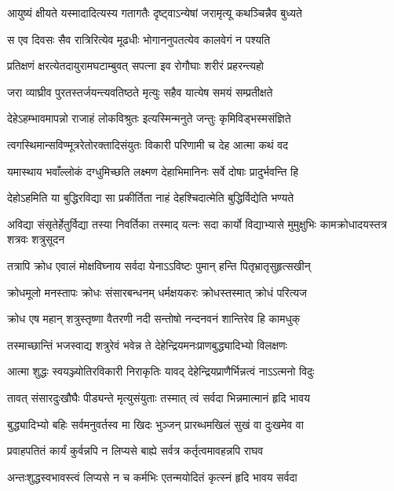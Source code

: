 \twolineshloka
{आयुष्यं क्षीयते यस्मादादित्यस्य गतागतैः}
{दृष्ट्वाऽन्येषां जरामृत्यू कथञ्चिन्नैव बुध्यते} %

\twolineshloka
{स एव दिवसः सैव रात्रिरित्येव मूढधीः}
{भोगाननुपतत्येव कालवेगं न पश्यति} %

\twolineshloka
{प्रतिक्षणं क्षरत्येतदायुरामघटाम्बुवत्}
{सपत्ना इव रोगौघाः शरीरं प्रहरन्त्यहो} %

\twolineshloka
{जरा व्याघ्रीव पुरतस्तर्जयन्त्यवतिष्ठते}
{मृत्युः सहैव यात्येष समयं सम्प्रतीक्षते} %

\twolineshloka
{देहेऽहम्भावमापन्नो राजाहं लोकविश्रुतः}
{इत्यस्मिन्मनुते जन्तुः कृमिविड्भस्मसंज्ञिते} %

\twolineshloka
{त्वगस्थिमान्सविण्मूत्ररेतोरक्तादिसंयुतः}
{विकारी परिणामी च देह आत्मा कथं वद} %

\twolineshloka
{यमास्थाय भवाँल्लोकं दग्धुमिच्छति लक्ष्मण}
{देहाभिमानिनः सर्वे दोषाः प्रादुर्भवन्ति हि} %

\twolineshloka
{देहोऽहमिति या बुद्धिरविद्या सा प्रकीर्तिता}
{नाहं देहश्चिदात्मेति बुद्धिर्विद्येति भण्यते} %

\threelineshloka
{अविद्या संसृतेर्हेतुर्विद्या तस्या निवर्तिका}
{तस्माद् यत्नः सदा कार्यो विद्याभ्यासे मुमुक्षुभिः}
{कामक्रोधादयस्तत्र शत्रवः शत्रुसूदन} %

\twolineshloka
{तत्रापि क्रोध एवालं मोक्षविघ्नाय सर्वदा}
{येनाऽऽविष्टः पुमान् हन्ति पितृभ्रातृसुहृत्सखीन्} %

\twolineshloka
{क्रोधमूलो मनस्तापः क्रोधः संसारबन्धनम्}
{धर्मक्षयकरः क्रोधस्तस्मात् क्रोधं परित्यज} %

\twolineshloka
{क्रोध एष महान् शत्रुस्तृष्णा वैतरणी नदी}
{सन्तोषो नन्दनवनं शान्तिरेव हि कामधुक्} %

\twolineshloka
{तस्माच्छान्तिं भजस्वाद्य शत्रुरेवं भवेन्न ते}
{देहेन्द्रियमनःप्राणबुद्ध्यादिभ्यो विलक्षणः} %

\twolineshloka
{आत्मा शुद्धः स्वयञ्ज्योतिरविकारी निराकृतिः}
{यावद् देहेन्द्रियप्राणैर्भिन्नत्वं नाऽऽत्मनो विदुः} %

\twolineshloka
{तावत् संसारदुःखौघैः पीड्यन्ते मृत्युसंयुताः}
{तस्मात् त्वं सर्वदा भिन्नमात्मानं हृदि भावय} %

\twolineshloka
{बुद्ध्यादिभ्यो बहिः सर्वमनुवर्तस्व मा खिदः}
{भुञ्जन् प्रारब्धमखिलं सुखं वा दुःखमेव वा} %

\twolineshloka
{प्रवाहपतितं कार्यं कुर्वन्नपि न लिप्यसे}
{बाह्ये सर्वत्र कर्तृत्वमावहन्नपि राघव} %

\twolineshloka
{अन्तःशुद्धस्वभावस्त्वं लिप्यसे न च कर्मभिः}
{एतन्मयोदितं कृत्स्नं हृदि भावय सर्वदा} %

